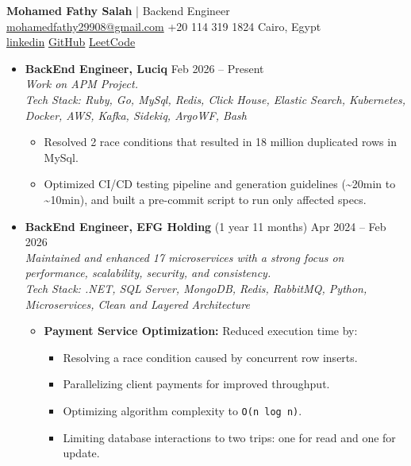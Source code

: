 \documentclass[11pt]{article}
\newcommand{\fancysection}[1]{%
  \vspace{.5em}
  \noindent
  \makebox[\linewidth]{%
    \leavevmode
    \leaders\hrule height 0.4pt\hfill
    \hspace{0.8em}
    \textbf{#1}
    \hspace{0.8em}
    \leaders\hrule height 0.4pt\hfill
  }%
  \vspace{.2em}
}
\begin{document}
\begin{center}
  {\LARGE \textbf{Mohamed Fathy Salah} | Backend Engineer}\\[0.5em]
  \href{mailto:mohamedfathy29908@gmail.com}{mohamedfathy29908@gmail.com}
  \quad +20 114 319 1824
  \quad Cairo, Egypt \\[0.2em]
  \href{https://linkedin.com/in/mohamed-fathy-b30047202}{linkedin}\quad
  \href{https://github.com/Mohamed-Fathy-Salah}{GitHub} \quad
  \href{https://leetcode.com/u/user1869Z/}{LeetCode} \quad
\end{center}
\vspace{-1em}

\fancysection{Experience}
\begin{itemize}[left=0pt]
  \item \textbf{BackEnd Engineer, Luciq} \hfill Feb 2026 -- Present \\
    \textit{Work on APM Project.\\Tech Stack: Ruby, Go, MySql, Redis, Click House, Elastic
    Search, Kubernetes, Docker, AWS, Kafka, Sidekiq, ArgoWF, Bash}
    \begin{itemize}
        \item Resolved 2 race conditions that resulted in 18 million duplicated rows in MySql.
        \item Optimized CI/CD testing pipeline and generation guidelines (\textasciitilde20min to \textasciitilde10min), and built a pre-commit script to run only affected specs.
    \end{itemize}

    \vspace{.1em}
  \item \textbf{BackEnd Engineer, EFG Holding}
    \hfill (1 year 11 months) Apr 2024 -- Feb 2026 \\
    \textit{Maintained and enhanced 17 microservices with a strong
      focus on performance, scalability, security, and
      consistency.\\Tech Stack: .NET, SQL Server, MongoDB, Redis,
    RabbitMQ, Python, Microservices, Clean and Layered Architecture}

    \begin{itemize}[left=0pt]
      \item \textbf{Payment Service Optimization:}
        Reduced execution time by:
        \begin{itemize}
          \item Resolving a race condition caused by concurrent row inserts.
          \item Parallelizing client payments for improved throughput.
          \item Optimizing algorithm complexity to \texttt{O(n log n)}.
          \item Limiting database interactions to two trips: one for
            read and one for update.
        \end{itemize}


\end{itemize}
\end{itemize}
\end{document}
